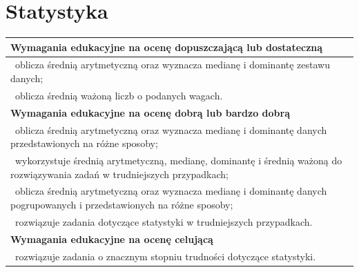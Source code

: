 \documentclass[12pt,a4paper]{article}
\begin{document}
	\section{Statystyka}
	
	\begin{longtable}{|p{16cm}|}
		\hline
		
		\textbf{Wymagania edukacyjne na ocenę dopuszczającą lub dostateczną} \\ \hline
		
		\textbullet\ oblicza średnią arytmetyczną oraz wyznacza medianę i dominantę zestawu danych; \\
		
		\textbullet\ oblicza średnią ważoną liczb o podanych wagach. \\ \hline
		
		\textbf{Wymagania edukacyjne na ocenę dobrą lub bardzo dobrą} \\ \hline
		
		\textbullet\ oblicza średnią arytmetyczną oraz wyznacza medianę i dominantę danych przedstawionych na różne sposoby; \\
		
		\textbullet\ wykorzystuje średnią arytmetyczną, medianę, dominantę i średnią ważoną do rozwiązywania zadań w trudniejszych przypadkach; \\
		
		\textbullet\ oblicza średnią arytmetyczną oraz wyznacza medianę i dominantę danych pogrupowanych i przedstawionych na różne sposoby; \\
		
		\textbullet\ rozwiązuje zadania dotyczące statystyki w trudniejszych przypadkach. \\ \hline
		
		\textbf{Wymagania edukacyjne na ocenę celującą} \\ \hline
		
		\textbullet\ rozwiązuje zadania o znacznym stopniu trudności dotyczące statystyki. \\ \hline
		
	\end{longtable}
	
\end{document}
